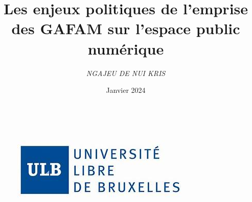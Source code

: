 \documentclass[12pt,a4paper]{article} %
\title {\textbf {Les enjeux politiques de l’emprise des GAFAM sur l’espace public numérique }} %
\author{\textit{NGAJEU DE NUI KRIS}} %
\date{Janvier 2024} %
\begin{document}
	
	\maketitle %
	
	
	\begin{figure}[h]
		\centering
		\includegraphics[scale=1]{ulb}
	\end{figure}
	
	
	\tableofcontents %
	
\end{document}
